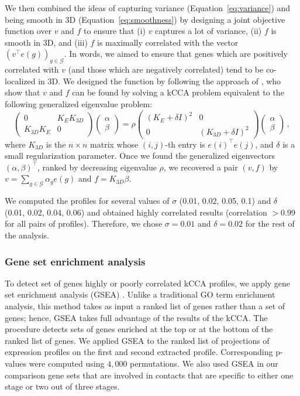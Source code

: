 We then combined the ideas of capturing variance (Equation~\ref{eq:variance}) and being
smooth in 3D (Equation~\ref{eq:smoothness}) by designing a joint objective function
over $v$ and $f$ to ensure that (i) $v$ captures a lot of variance, (ii) $f$
is smooth in 3D, and (iii) $f$ is maximally correlated with the vector
$\left(v^\top e(g)\right)_{g\in\mathcal{G}}$. In words, we aimed to ensure that
genes which are positively correlated with $v$ (and those which are negatively
correlated) tend to be co-localized in 3D. We designed the function by following
the approach of \cite{bach:kernel}, who show that $v$ and $f$
can be found by solving a kCCA problem equivalent to the following generalized
eigenvalue problem:
\[
\left(\begin{array}{cc}0 & K_E K_{3D} \\ K_{3D} K_E & 0\end{array}\right)
\left(\begin{array}{c}\alpha \\ \beta\end{array}\right)
= \rho
\left(\begin{array}{cc}(K_E+\delta I)^2 & 0 \\ 0 & (K_{3D}+\delta I)^2\end{array}\right)
\left(\begin{array}{c}\alpha \\ \beta\end{array}\right)\,,
\]
where $K_{3D}$ is the $n \times n$ matrix whose $(i,j)$-th entry is $e(i)^\top
e(j)$, and $\delta$ is a small regularization parameter. Once we found the
generalized eigenvectors $(\alpha,\beta)^\top$, ranked by decreasing
eigenvalue $\rho$, we recovered a pair $(v,f)$ by $v = \sum_{g\in\mathcal{G}}
\alpha_g e(g)$ and $f=K_{3D} \beta$.

We computed the profiles for several values of $\sigma$ (0.01, 0.02, 0.05,
0.1) and $\delta$ (0.01, 0.02, 0.04, 0.06) and obtained highly correlated results
(correlation $>0.99$ for all pairs of profiles). Therefore, we chose
$\sigma = 0.01$ and $\delta = 0.02$ for the rest of the analysis.

\subsubsection{Gene set enrichment analysis}
\label{met:GSEA}
To detect set of genes highly or poorly correlated kCCA profiles, we apply gene
set enrichment analysis (GSEA) \citep{subramanian:gene}. Unlike a traditional
GO term enrichment analysis, this method takes as input a ranked list of genes
rather than a set of genes; hence, GSEA takes full advantage of the results of
the kCCA.  The procedure detects sets of genes enriched at the top or at the
bottom of the ranked list of genes. We applied GSEA to the ranked list of projections
of expression profiles on the first and second extracted profile. Corresponding
p-values were computed using $4,000$ permutations. We also used GSEA in our
comparison gene sets that are involved in contacts that are specific to either
one stage or two out of three stages.


